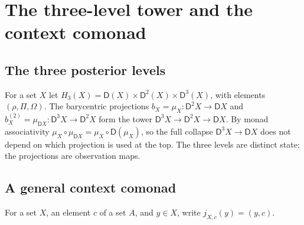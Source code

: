 \documentclass[11pt]{article}
\theoremstyle{definition}
\theoremstyle{remark}
\newcommand{\D}{\mathsf{D}}
\begin{document}
\section{The three-level tower and the context comonad}

\subsection{The three posterior levels}

For a set $X$ let $H_3(X)=\D(X)\times\D^2(X)\times\D^3(X)$, with elements $(\rho,\Pi,\Omega)$. The
barycentric projections $b_X=\mu_X\colon\D^2X\to\D X$ and $b^{(2)}_X=\mu_{\D X}\colon\D^3X\to\D^2X$
form the tower $\D^3X\to\D^2X\to\D X$. By monad associativity
$\mu_X\circ\mu_{\D X}=\mu_X\circ\D(\mu_X)$, so the full collapse $\D^3X\to\D X$ does not depend on
which projection is used at the top. The three levels are distinct state; the projections are
observation maps.

\subsection{A general context comonad}

For a set $X$, an element $c$ of a set $A$, and $y\in X$, write $j_{X,c}(y)=(y,c)$.
\end{document}
